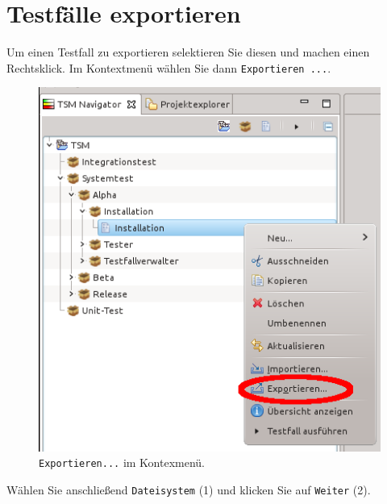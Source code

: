 \documentclass[11pt,a4paper,titlepage]{article}
\begin{document}
\section{Testfälle exportieren}
Um einen Testfall zu exportieren selektieren Sie diesen und machen einen Rechtsklick. Im Kontextmenü wählen Sie dann \texttt{Exportieren ...}.
\begin{figure}[H]
 \centering
 \includegraphics{./ImportierenExportieren/kontextmenue-exp.png}
 \caption{\texttt{Exportieren...} im Kontexmenü.}
 \label{abb:Kontextmenue-exp}
\end{figure}
\vspace{\baselineskip}
Wählen Sie anschließend \texttt{Dateisystem} (1) und klicken Sie auf \texttt{Weiter} (2).
\end{document}
